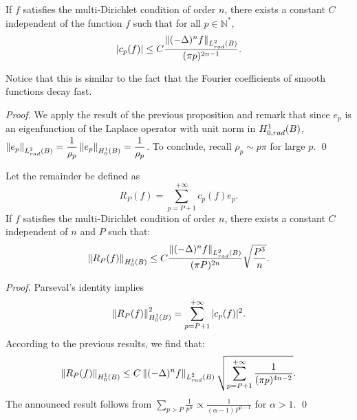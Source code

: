 \documentclass[smallextended]{svjour3}
\begin{document}
\begin{corollary} If $f$ satisfies the multi-Dirichlet condition of order $n$, there exists a constant $C$ independent of the function $f$ such that for all $p \in \mathbb{N^*}$, 
	\[ |c_p(f)| \leq  C \dfrac{\left\|(-\Delta)^n f\right\|_{L^2_{rad}(B)}}{(\pi p)^{2n-1}}.\] 
\end{corollary}
\noindent Notice that this is similar to the fact that the Fourier coefficients of smooth functions decay fast. 
\begin{proof}
	We apply the result of the previous proposition and remark that since $e_p$ is an eigenfunction of the Laplace operator with unit norm in $H^1_{0,rad}(B)$, $\left\|e_p\right\|_{L^2_{rad}(B)} = \dfrac{1}{\rho_p}\left\|e_p\right\|_{H^1_0(B)} = \dfrac{1}{\rho_p}$. To conclude, recall $\rho_{p} \sim p\pi$ for large $p$.
	\qed
\end{proof}			
\begin{corollary} Let the remainder be defined as 
	\[R_P(f) = \displaystyle\sum_{p = P+1}^{+\infty} c_{p}(f) e_{p}.\]
	If $f$ satisfies the multi-Dirichlet condition of order $n$, there exists a constant $C$ independent of $n$ and $P$ such that: 
	\[\left\|R_P(f)\right\|_{H^1_0(B)} \leq C\dfrac{\left\|(-\Delta)^n f\right\|_{L^2_{rad}(B)}}{(\pi P)^{2n}}\sqrt{\dfrac{P^3}{n}}.\]
	\label{EstimationRest}
\end{corollary}																												
\begin{proof}
	Parseval's identity implies
	\[\left\|R_P(f)\right\|_{H^1_0(B)}^2 = \sum_{p=P+1}^{+\infty}|c_p(f)|^2.\]																																			
	According to the previous results, we find that:
	\[\left\|R_P(f)\right\|_{H^1_0(B)} \leq C \left\|(-\Delta)^n f\right\|_{L^2_{rad}(B)}\sqrt{\sum_{p= P+1}^{+\infty} \dfrac{1}{(\pi p)^{4n-2}}}.\]
	The announced result follows from $\displaystyle\sum_{p > P} \frac{1}{p^{\alpha}} \propto \frac{1}{(\alpha - 1)P^{\alpha-1}}$ for $\alpha > 1$. 
	\qed
\end{proof}
										
										
\end{document}
